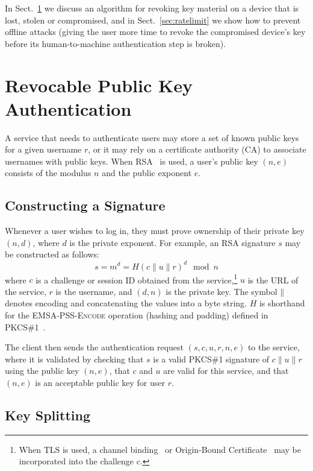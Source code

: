 \documentclass{llncs}
\newcommand*{\concat}{\mathbin{\|}}
\begin{document}
In Sect.~\ref{sec:revocation} we discuss an algorithm for revoking key material on a device that is
lost, stolen or compromised, and in Sect.~\ref{sec:ratelimit} we show how to prevent offline attacks
(giving the user more time to revoke the compromised device's key before its human-to-machine
authentication step is broken).

\section{Revocable Public Key Authentication}\label{sec:revocation}

A service that needs to authenticate users may store a set of known public keys for a given username
$r$, or it may rely on a certificate authority (CA) to associate usernames with public keys. When
RSA~\cite{RSA} is used, a user's public key $(n, e)$ consists of the modulus $n$ and the public
exponent $e$.

\subsection{Constructing a Signature}\label{sec:signature}

Whenever a user wishes to log in, they must prove ownership of their private key $(n, d)$, where $d$
is the private exponent. For example, an RSA signature $s$ may be constructed as follows:
\begin{equation}
s = m^d = H(c \concat u \concat r)^d \mod n
\end{equation}
where $c$ is a challenge or session ID obtained from the service,\footnote{When TLS is used, a
channel binding~\cite{ChannelBinding} or Origin-Bound Certificate~\cite{Dietz12} may be incorporated
into the challenge $c$.} $u$ is the URL of the service, $r$ is the username, and $(d, n)$ is the
private key. The symbol $\concat$ denotes encoding and concatenating the values into a byte string.
$H$ is shorthand for the \textsc{EMSA-PSS-Encode} operation (hashing and padding) defined in
PKCS\#1~\cite{PKCS1}.

The client then sends the authentication request $(s, c, u, r, n, e)$ to the service, where it is
validated by checking that $s$ is a valid PKCS\#1 signature of $c \concat u \concat r$ using the
public key $(n, e)$, that $c$ and $u$ are valid for this service, and that $(n, e)$ is an acceptable
public key for user $r$.

\subsection{Key Splitting}\label{sec:splitting}
\end{document}
